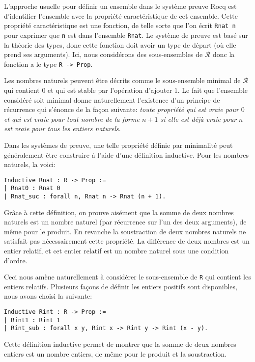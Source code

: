\documentclass[draft]{jflart}
\begin{document}
L'approche usuelle pour définir un ensemble dans le système preuve
Rocq est d'identifier l'ensemble avec la propriété caractéristique de
cet ensemble.  Cette propriété caractéristique est une fonction, de
telle sorte que l'on écrit \texttt{Rnat n} pour exprimer que \texttt{n} est
dans l'ensemble \texttt{Rnat}.  Le système de preuve est basé sur la
théorie des types, donc cette fonction doit avoir un type de départ
(où elle prend ses arguments).  Ici, nous considérons des
sous-ensembles de \(\mathcal R\) donc la fonction a le type \texttt{R ->
  Prop}.

Les nombres naturels peuvent être décrits comme le sous-ensemble
minimal de \(\mathcal R\) qui contient \(0\) et qui est stable par
l'opération d'ajouter \(1\).  Le fait que l'ensemble considéré soit
minimal donne naturellement l'existence d'un principe de récurrence
qui s'énonce de la façon suivante: {\em toute propriété qui est vraie
  pour \(0\) et qui est vraie pour tout nombre de la forme \(n + 1\)
  si elle est déjà vraie pour \(n\) est vraie pour tous les entiers
  naturels}.

Dans les systèmes de preuve, une telle propriété définie par minimalité
peut généralement être construire à l'aide d'une définition inductive.
Pour les nombres naturels, la voici:
\begin{verbatim}
Inductive Rnat : R -> Prop :=
| Rnat0 : Rnat 0
| Rnat_suc : forall n, Rnat n -> Rnat (n + 1).
\end{verbatim}

Grâce à cette définition, on prouve aisément que la somme de deux
nombres naturels est un nombre naturel (par récurrence sur l'un des
deux arguments), de même pour le produit.  En revanche la soustraction
de deux nombres naturels ne satisfait pas nécessairement cette
propriété.  La différence de deux nombres est un entier relatif, et
cet entier relatif est un nombre naturel sous une condition d'ordre.

Ceci nous amène naturellement à considérer le sous-ensemble de \texttt{R}
qui contient les entiers relatifs.  Plusieurs façons de définir les
entiers positifs sont disponibles, nous avons choisi la suivante:
\begin{verbatim}
Inductive Rint : R -> Prop :=
| Rint1 : Rint 1
| Rint_sub : forall x y, Rint x -> Rint y -> Rint (x - y).
\end{verbatim}
Cette définition inductive permet de montrer que la somme de deux
nombres entiers est un nombre entiers, de même pour le produit et
la soustraction.
\end{document}
